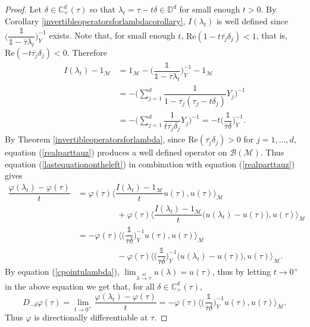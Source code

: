 \documentclass[11pt, reqno]{amsart}
\newcommand\1{\boldsymbol {1}}
\numberwithin{equation}{section}
\begin{document}
\begin{proof}
Let $ \delta\in\mathbb{C}_{+}^{d}(\tau)$ so that $\lambda_{t}=\tau-t\delta\in\mathbb{D}^{d}$ for small enough $t>0$. By Corollary \ref{invertibleoperatorsforlambdacorollary}, $I(\lambda_{t})$ is well defined since $\bigg(\dfrac{\mathds{1}}{\mathds{1}-\overline{\tau}\lambda_{t}}\bigg)_{Y}^{-1}$ exists. Note that, for small enough $t$, $\mathrm{Re}(1-t\overline{\tau_{j}}\delta_{j})<1$, that is, $\mathrm{Re}(-t\overline{\tau_{j}}\delta_{j})<0$. Therefore
\begin{align}
    I(\lambda_{t})-1_{\mathcal{M}} &=1_{\mathcal{M}}-\bigg(\dfrac{\mathds{1}}{\mathds{1}-\overline{\tau}\lambda_{t}}\bigg)_{Y}^{-1}-1_{\mathcal{M}} \nonumber\\
    &=-\bigg(\sum_{j=1}^{d}\dfrac{1}{1-\overline{\tau_{j}}(\tau_{j}-t \delta_{j})}Y_{j}\bigg)^{-1}\nonumber\\
    &=-\bigg(\sum_{j=1}^{d}\dfrac{1}{t\overline{\tau_{j}} \delta_{j}}Y_{j}\bigg)^{-1}
    =-t\bigg(\dfrac{\mathds{1}}{\overline{\tau} \delta}\bigg)_{Y}^{-1}\label{realparttauz}.
\end{align}
By Theorem \ref{invertibleoperatorsforlambda},  since $\mathrm{Re}(\overline{\tau_{j}} \delta_{j})>0$ for $j=1,\hdots,d$,
equation (\ref{realparttauz}) produces a well defined operator on $\mathcal{B}(\mathcal{M})$. Thus equation (\ref{lastequationontheleft}) in combination with equation (\ref{realparttauz}) gives 
\begin{align*}
\dfrac{\varphi(\lambda_{t})-\varphi(\tau)}{t}&=\varphi(\tau)\bigg\langle \dfrac{I(\lambda_{t})-1_{\mathcal{M}}}{t} u(\tau), u(\tau) \bigg \rangle_{\mathcal{M}}\\ 
&\hspace{2cm}+\varphi(\tau)\bigg\langle \dfrac{I(\lambda_{t})-1_{\mathcal{M}}}{t}\big(u(\lambda_{t})-u(\tau)\big),u(\tau)\bigg\rangle_{\mathcal{M}}\\
&=-\varphi(\tau)\bigg\langle\bigg(\dfrac{\mathds{1}}{\overline{\tau} \delta}\bigg)_{Y}^{-1}u(\tau),u(\tau)\bigg\rangle_{\mathcal{M}}\nonumber\\
&\hspace{2cm}-\varphi(\tau)\bigg\langle \bigg(\dfrac{\mathds{1}}{\overline{\tau} \delta}\bigg)_{Y}^{-1}\big(u(\lambda_{t})-u(\tau)\big),u(\tau)\bigg\rangle_{\mathcal{M}}.
\end{align*}
By equation (\ref{cpointulambda}), $\lim_{\lambda{\overset{nt}{\rightarrow}} \tau}u(\lambda)=u(\tau)$, thus by letting $t\rightarrow 0^{+}$ in the above equation we get that, for all $\delta\in\mathbb{C}_{+}^{d}(\tau)$, 
\begin{equation}\label{directionalderiv123}
    D_{-\delta}\varphi(\tau)=\lim_{t\rightarrow 0^{+}} \dfrac{\varphi(\lambda_{t})-\varphi(\tau)}{t} =-\varphi(\tau)\bigg\langle \bigg(\dfrac{\mathds{1}}{\overline{\tau} \delta}\bigg)_{Y}^{-1}u(\tau),u(\tau)\bigg\rangle_{\mathcal{M}}.
\end{equation}
Thus $\varphi$ is directionally differentiable at $\tau$.



\end{proof}
\end{document}
